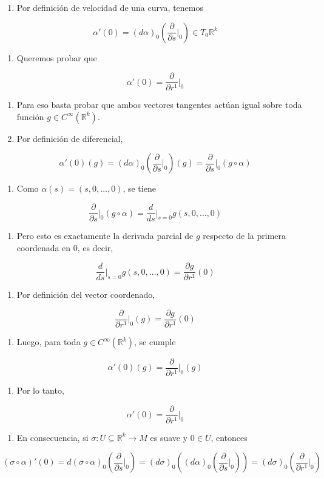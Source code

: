 \begin{bookproof}{}
\begin{enumerate}
\item Por definición de velocidad de una curva, tenemos
\end{enumerate}
\[
\alpha'(0)=(d\alpha)_0\left(\frac{\partial}{\partial s}\big|_0\right)\in T_0\mathbb R^k
\]
\begin{enumerate}[start=2]
\item Queremos probar que
\end{enumerate}
\[
\alpha'(0)=\frac{\partial}{\partial r^1}\big|_0
\]
\begin{enumerate}[start=3]
\item Para eso basta probar que ambos vectores tangentes actúan igual sobre toda función $g\in C^\infty(\mathbb R^k)$.
\item Por definición de diferencial,
\end{enumerate}
\[
\alpha'(0)(g)=(d\alpha)_0\left(\frac{\partial}{\partial s}\big|_0\right)(g)=\frac{\partial}{\partial s}\big|_0(g\circ\alpha)
\]
\begin{enumerate}[start=5]
\item Como $\alpha(s)=(s,0,\ldots,0)$, se tiene
\end{enumerate}
\[
\frac{\partial}{\partial s}\big|_0(g\circ\alpha)=\frac{d}{ds}\big|_{s=0}g(s,0,\ldots,0)
\]
\begin{enumerate}[start=6]
\item Pero esto es exactamente la derivada parcial de $g$ respecto de la primera coordenada en $0$, es decir,
\end{enumerate}
\[
\frac{d}{ds}\big|_{s=0}g(s,0,\ldots,0)=\frac{\partial g}{\partial r^1}(0)
\]
\begin{enumerate}[start=7]
\item Por definición del vector coordenado,
\end{enumerate}
\[
\frac{\partial}{\partial r^1}\bigg|_0(g)=\frac{\partial g}{\partial r^1}(0)
\]
\begin{enumerate}[start=8]
\item Luego, para toda $g\in C^\infty(\mathbb R^k)$, se cumple
\end{enumerate}
\[
\alpha'(0)(g)=\frac{\partial}{\partial r^1}\big|_0(g)
\]
\begin{enumerate}[start=9]
\item Por lo tanto,
\end{enumerate}
\[
\alpha'(0)=\frac{\partial}{\partial r^1}\big|_0
\]
\begin{enumerate}[start=10]
\item En consecuencia, si $\sigma:U\subseteq\mathbb R^k\to M$ es suave y $0\in U$, entonces
\end{enumerate}
\[
(\sigma\circ\alpha)'(0)=d(\sigma\circ\alpha)_0\left(\frac{\partial}{\partial s}\big|_0\right)=(d\sigma)_0\left((d\alpha)_0\left(\frac{\partial}{\partial s}\big|_0\right)\right)=(d\sigma)_0\left(\frac{\partial}{\partial r^1}\big|_0\right)
\]
\bookqed
\end{bookproof}
\label{blk:99bdaa}
